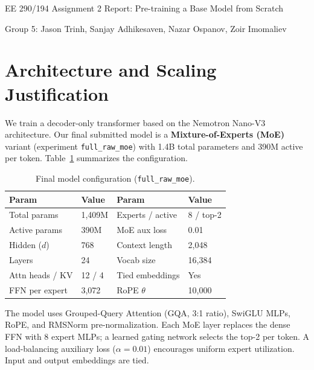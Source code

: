 \documentclass[10pt]{article}
\begin{document}
\begin{center}
{\Large EE 290/194 Assignment 2 Report: Pre-training a Base Model from Scratch\par}
\vspace{2pt}
{\normalsize Group 5: Jason Trinh, Sanjay Adhikesaven, Nazar Ospanov, Zoir Imomaliev \par}
\end{center}
\vspace{-10pt}

\section{Architecture and Scaling Justification}

We train a decoder-only transformer based on the Nemotron Nano-V3 architecture.
Our final submitted model is a \textbf{Mixture-of-Experts (MoE)} variant (experiment \texttt{full\_raw\_moe}) with 1.4B total parameters and 390M active per token. Table~\ref{tab:model_config} summarizes the configuration.

\begin{table}[H]
\centering
\caption{Final model configuration (\texttt{full\_raw\_moe}).}
\label{tab:model_config}
\begin{tabular}{ll|ll}
\toprule
\textbf{Param} & \textbf{Value} & \textbf{Param} & \textbf{Value} \\
\midrule
Total params      & 1,409M   & Experts / active   & 8 / top-2 \\
Active params     & 390M     & MoE aux loss       & 0.01 \\
Hidden ($d$)      & 768      & Context length     & 2,048 \\
Layers            & 24       & Vocab size         & 16,384 \\
Attn heads / KV   & 12 / 4   & Tied embeddings    & Yes \\
FFN per expert    & 3,072    & RoPE $\theta$      & 10,000 \\
\bottomrule
\end{tabular}
\end{table}

The model uses Grouped-Query Attention (GQA, 3:1 ratio), SwiGLU MLPs, RoPE, and RMSNorm pre-normalization. Each MoE layer replaces the dense FFN with 8 expert MLPs; a learned gating network selects the top-2 per token. A load-balancing auxiliary loss ($\alpha{=}0.01$) encourages uniform expert utilization. Input and output embeddings are tied.
\end{document}
